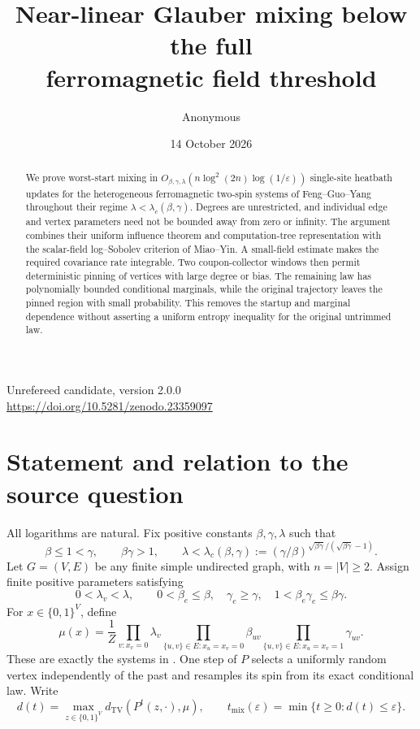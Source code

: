 \documentclass[11pt]{article}
\title{Near-linear Glauber mixing below the full\protect\\ferromagnetic field threshold}
\author{Anonymous}
\date{14 October 2026}
\theoremstyle{remark}\newtheorem{remark}[theorem]{Remark}
\newcommand{\TV}{d_{\mathrm{TV}}}
\begin{document}
\maketitle
\begin{center}\small Unrefereed candidate, version 2.0.0\\
\url{https://doi.org/10.5281/zenodo.23359097}\end{center}
\begin{abstract}
We prove worst-start mixing in
$O_{\beta,\gamma,\lambda}(n\log^2(2n)\log(1/\varepsilon))$
single-site heatbath updates for the heterogeneous ferromagnetic two-spin
systems of Feng--Guo--Yang throughout their regime
$\lambda<\lambda_c(\beta,\gamma)$. Degrees are unrestricted, and individual
edge and vertex parameters need not be bounded away from zero or infinity.
The argument combines their uniform influence theorem and computation-tree
representation with the scalar-field log--Sobolev criterion of Miao--Yin.
A small-field estimate makes the required covariance rate integrable.
Two coupon-collector windows then permit deterministic pinning of vertices
with large degree or bias. The remaining law has polynomially bounded
conditional marginals, while the original trajectory leaves the pinned
region with small probability. This removes the startup and marginal
dependence without asserting a uniform entropy inequality for the original
untrimmed law.
\end{abstract}

\section{Statement and relation to the source question}

All logarithms are natural. Fix positive constants $\beta,\gamma,\lambda$
such that
\begin{equation}\label{eq:triple}
 \beta\leq1<\gamma,\qquad \beta\gamma>1,\qquad
 \lambda<\lambda_c(\beta,\gamma):=
 (\gamma/\beta)^{\sqrt{\beta\gamma}/(\sqrt{\beta\gamma}-1)}.
\end{equation}
Let $G=(V,E)$ be any finite simple undirected graph, with $n=|V|\geq2$.
Assign finite positive parameters satisfying
\begin{equation}\label{eq:parameters}
 0<\lambda_v<\lambda,\qquad
 0<\beta_e\leq\beta,\quad \gamma_e\geq\gamma,\quad
 1<\beta_e\gamma_e\leq\beta\gamma.
\end{equation}
For $x\in\{0,1\}^V$, define
\begin{equation}\label{eq:measure}
 \mu(x)=\frac1Z
 \prod_{v:x_v=0}\lambda_v
 \prod_{\{u,v\}\in E:x_u=x_v=0}\beta_{uv}
 \prod_{\{u,v\}\in E:x_u=x_v=1}\gamma_{uv}.
\end{equation}
These are exactly the systems in \cite[Definition~4]{FGY26}.
One step of $P$ selects a uniformly random vertex independently of the
past and resamples its spin from its exact conditional law. Write
\[
 d(t)=\max_{z\in\{0,1\}^V}\TV(P^t(z,\cdot),\mu),\qquad
 t_{\mathrm{mix}}(\varepsilon)=\min\{t\geq0:d(t)\leq\varepsilon\}.
\]
\end{document}
